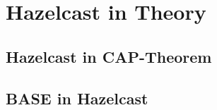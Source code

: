 
\section{Hazelcast in Theory}
\todo{}
\subsection{Hazelcast in CAP-Theorem}
\todo{}
\subsection{BASE in Hazelcast}
\todo{}